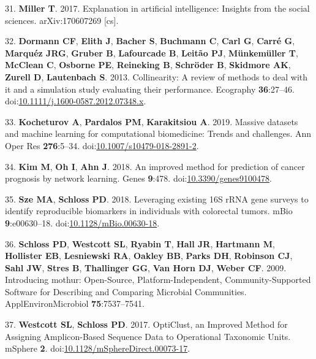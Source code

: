 \documentclass[11pt,]{article}
\begin{document}
\hypertarget{ref-miller_explanation_2017}{}
31. \textbf{Miller T}. 2017. Explanation in artificial intelligence:
Insights from the social sciences. arXiv:170607269 {[}cs{]}.

\hypertarget{ref-dormann_collinearity:_2013}{}
32. \textbf{Dormann CF}, \textbf{Elith J}, \textbf{Bacher S},
\textbf{Buchmann C}, \textbf{Carl G}, \textbf{Carré G}, \textbf{Marquéz
JRG}, \textbf{Gruber B}, \textbf{Lafourcade B}, \textbf{Leitão PJ},
\textbf{Münkemüller T}, \textbf{McClean C}, \textbf{Osborne PE},
\textbf{Reineking B}, \textbf{Schröder B}, \textbf{Skidmore AK},
\textbf{Zurell D}, \textbf{Lautenbach S}. 2013. Collinearity: A review
of methods to deal with it and a simulation study evaluating their
performance. Ecography \textbf{36}:27--46.
doi:\href{https://doi.org/10.1111/j.1600-0587.2012.07348.x}{10.1111/j.1600-0587.2012.07348.x}.

\hypertarget{ref-kocheturov_massive_2019}{}
33. \textbf{Kocheturov A}, \textbf{Pardalos PM}, \textbf{Karakitsiou A}.
2019. Massive datasets and machine learning for computational
biomedicine: Trends and challenges. Ann Oper Res \textbf{276}:5--34.
doi:\href{https://doi.org/10.1007/s10479-018-2891-2}{10.1007/s10479-018-2891-2}.

\hypertarget{ref-kim_improved_2018}{}
34. \textbf{Kim M}, \textbf{Oh I}, \textbf{Ahn J}. 2018. An improved
method for prediction of cancer prognosis by network learning. Genes
\textbf{9}:478.
doi:\href{https://doi.org/10.3390/genes9100478}{10.3390/genes9100478}.

\hypertarget{ref-sze_leveraging_2018}{}
35. \textbf{Sze MA}, \textbf{Schloss PD}. 2018. Leveraging existing 16S
rRNA gene surveys to identify reproducible biomarkers in individuals
with colorectal tumors. mBio \textbf{9}:e00630--18.
doi:\href{https://doi.org/10.1128/mBio.00630-18}{10.1128/mBio.00630-18}.

\hypertarget{ref-schloss_introducing_2009}{}
36. \textbf{Schloss PD}, \textbf{Westcott SL}, \textbf{Ryabin T},
\textbf{Hall JR}, \textbf{Hartmann M}, \textbf{Hollister EB},
\textbf{Lesniewski RA}, \textbf{Oakley BB}, \textbf{Parks DH},
\textbf{Robinson CJ}, \textbf{Sahl JW}, \textbf{Stres B},
\textbf{Thallinger GG}, \textbf{Van Horn DJ}, \textbf{Weber CF}. 2009.
Introducing mothur: Open-Source, Platform-Independent,
Community-Supported Software for Describing and Comparing Microbial
Communities. ApplEnvironMicrobiol \textbf{75}:7537--7541.

\hypertarget{ref-westcott_opticlust_2017}{}
37. \textbf{Westcott SL}, \textbf{Schloss PD}. 2017. OptiClust, an
Improved Method for Assigning Amplicon-Based Sequence Data to
Operational Taxonomic Units. mSphere \textbf{2}.
doi:\href{https://doi.org/10.1128/mSphereDirect.00073-17}{10.1128/mSphereDirect.00073-17}.
\end{document}
